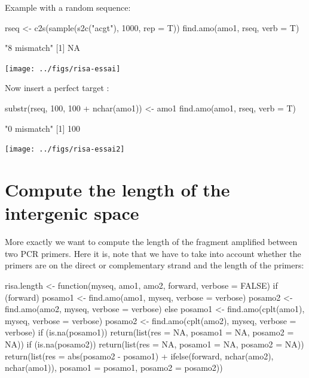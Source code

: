 \documentclass{article}
\begin{document}
Example with a random sequence:

\begin{Schunk}
\begin{Sinput}
 rseq <- c2s(sample(s2c("acgt"), 1000, rep = T))
 find.amo(amo1, rseq, verb = T)
\end{Sinput}
\begin{Soutput}
[1] "8 mismatch"
[1] NA
\end{Soutput}
\end{Schunk}
\texttt{[image: ../figs/risa-essai]}

Now insert a perfect target :

\begin{Schunk}
\begin{Sinput}
 substr(rseq, 100, 100 + nchar(amo1)) <- amo1
 find.amo(amo1, rseq, verb = T)
\end{Sinput}
\begin{Soutput}
[1] "0 mismatch"
[1] 100
\end{Soutput}
\end{Schunk}
\texttt{[image: ../figs/risa-essai2]}

\section{Compute the length of the intergenic space}

More exactly we want to compute the length of the fragment amplified
between two PCR primers. Here it is, note that we have to take into account
whether the primers are on the direct or complementary strand and the
length of the primers:

\begin{Schunk}
\begin{Sinput}
 risa.length <- function(myseq, amo1, amo2, forward, verbose = FALSE) {
     if (forward) {
         posamo1 <- find.amo(amo1, myseq, verbose = verbose)
         posamo2 <- find.amo(amo2, myseq, verbose = verbose)
     }
     else {
         posamo1 <- find.amo(cplt(amo1), myseq, verbose = verbose)
         posamo2 <- find.amo(cplt(amo2), myseq, verbose = verbose)
     }
     if (is.na(posamo1)) 
         return(list(res = NA, posamo1 = NA, posamo2 = NA))
     if (is.na(posamo2)) 
         return(list(res = NA, posamo1 = NA, posamo2 = NA))
     return(list(res = abs(posamo2 - posamo1) + ifelse(forward, 
         nchar(amo2), nchar(amo1)), posamo1 = posamo1, posamo2 = posamo2))
 }
\end{Sinput}
\end{Schunk}
\end{document}
